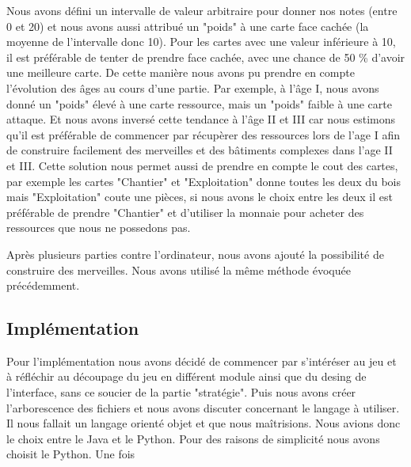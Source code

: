 \documentclass[a4paper, 12pt, french]{article}
\begin{document}

	Nous avons défini un intervalle de valeur arbitraire pour donner nos notes (entre 0 et 20) et nous avons
	aussi attribué un "poids" à une carte face cachée (la moyenne de l'intervalle donc 10). Pour les cartes avec une valeur
	inférieure à 10, il est préférable de tenter de prendre face cachée, avec une chance de 50 \% d'avoir une meilleure
	carte. De cette manière nous avons pu prendre en compte l'évolution des âges au cours d'une partie. Par exemple, à
	l'âge I, nous avons donné un "poids" élevé à une carte ressource, mais un "poids" faible à une carte attaque.
	Et nous avons inversé cette tendance à l'âge II et III car nous estimons qu'il est préférable de commencer par
	récupèrer des ressources lors de l'age I afin de construire facilement des merveilles et des bâtiments complexes
	dans l'age II et III. Cette solution nous permet aussi de prendre en compte le cout des cartes, par exemple les
	cartes "Chantier" et "Exploitation" donne toutes les deux du bois mais "Exploitation" coute une pièces, si nous
	avons le choix entre les deux il est préférable de prendre "Chantier" et d'utiliser la monnaie pour acheter des
	ressources que nous ne possedons pas.


	Après plusieurs parties contre l'ordinateur, nous avons ajouté la possibilité de construire des merveilles.
	Nous avons utilisé la même méthode évoquée précédemment.

	\subsection{Implémentation}
	Pour l'implémentation nous avons décidé de commencer par s'intéréser au jeu et à réfléchir au découpage du jeu
	en différent module ainsi que du desing de l'interface,	sans ce soucier de la partie "stratégie". Puis nous avons
	créer l'arborescence des fichiers et nous avons discuter concernant le langage à utiliser. Il nous fallait un
	langage orienté objet et que nous maîtrisions. Nous avions donc le choix entre le Java et le Python.
	Pour des raisons de simplicité nous avons choisit le Python. Une fois %
\end{document}
